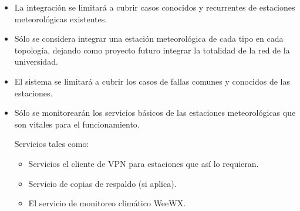 \begin{itemize}

\item La integración se limitará a cubrir casos conocidos y recurrentes de estaciones meteorológicas existentes.
\item Sólo se considera integrar una estación meteorológica de cada tipo en cada topología, dejando como proyecto futuro integrar la totalidad de la red de la universidad.
\item El sistema se limitará a cubrir los casos de fallas comunes y conocidos de las estaciones.
\item Sólo se monitorearán los servicios básicos de las estaciones meteorológicas que son vitales para el funcionamiento.

Servicios tales como:

\begin{itemize}
   \item Servicios el cliente de VPN para estaciones que así lo requieran.
   \item Servicio de copias de respaldo (si aplica).
   \item El servicio de monitoreo climático WeeWX.
\end{itemize}

\end{itemize}


